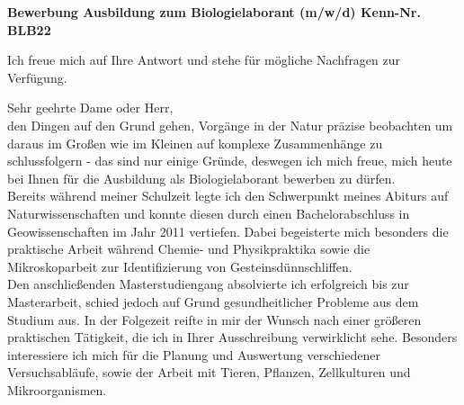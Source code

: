 \documentclass[11pt,a4paper,roman]{moderncv}
\begin{document}
\recipient{~}{ }
\date{\today}
\opening{\textbf{Bewerbung Ausbildung zum Biologielaborant (m/w/d) Kenn-Nr. BLB22
}}
\closing{Ich freue mich auf Ihre Antwort und stehe für mögliche Nachfragen zur Verfügung.}
\makelettertitle


Sehr geehrte Dame oder Herr,\\
den Dingen auf den Grund gehen, Vorgänge in der Natur präzise beobachten um daraus im Großen wie im Kleinen auf komplexe Zusammenhänge zu schlussfolgern - das sind nur einige Gründe, deswegen ich mich freue, mich heute bei Ihnen für die Ausbildung als Biologielaborant bewerben zu dürfen.\\
\vspace{5mm}
Bereits während meiner Schulzeit legte ich den Schwerpunkt meines Abiturs auf Naturwissenschaften und konnte diesen durch einen Bachelorabschluss in Geowissenschaften im Jahr 2011 vertiefen. Dabei begeisterte mich besonders die praktische Arbeit während Chemie- und Physikpraktika sowie die Mikroskoparbeit zur Identifizierung von Gesteinsdünnschliffen.\\
Den anschließenden Masterstudiengang absolvierte ich erfolgreich bis zur Masterarbeit, schied jedoch auf Grund gesundheitlicher Probleme aus dem Studium aus. In der Folgezeit reifte in mir der Wunsch nach einer größeren praktischen Tätigkeit, die ich in Ihrer Ausschreibung verwirklicht sehe.
Besonders interessiere ich mich für die Planung und Auswertung verschiedener Versuchsabläufe, sowie der  Arbeit mit Tieren, Pflanzen, Zellkulturen und Mikroorganismen.\\
\vspace{5mm}
\end{document}
